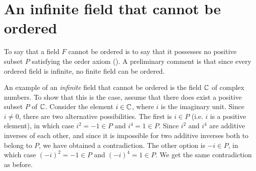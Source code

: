 \documentclass[11pt,twoside=off,numbers=noenddot]{scrbook}
\begin{document}
\section{An infinite field that cannot be ordered}
To say that a field $F$ cannot be ordered is to say that it possesses
no positive subset $P$ satisfying the order axiom
(). A preliminary comment is that since every
ordered field is infinite, no finite field can be ordered.

An example of an \textit{infinite} field that cannot be ordered is
the field $\mathbb C$ of complex numbers. To show that this is the case,
assume that there does exist a positive subset $P$ of $\mathbb C$. Consider
the element $i \in \mathbb C$, where $i$ is the imaginary unit. Since $i \neq
0$, there are two alternative possibilities. The first is $i \in P$
(i.e. $i$ is a positive element), in which case $i^2 = -1 \in P$ and
$i^4 = 1 \in P$. Since $i^2$ and $i^4$ are additive inverses of each
other, and since it is impossible for two additive inverses both to
belong to $P$, we have obtained a contradiction. The other option is
$-i \in P$, in which case $(-i)^2 = -1 \in P$ and $(-i)^4 = 1 \in P$.
We get the same contradiction as before.

\printbibliography[nottype=image]
\end{document}
